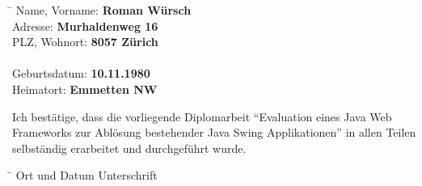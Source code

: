 \begin{tabbing}
  \hspace*{6cm}\= \kill
  Name, Vorname: \> {\bf Roman Würsch} \\
  Adresse: \> {\bf Murhaldenweg 16} \\
  PLZ, Wohnort: \> {\bf 8057 Zürich} \\
  \\
  Geburtsdatum: \> {\bf 10.11.1980} \\
  Heimatort: \> {\bf Emmetten NW} \\
\end{tabbing}

\noindent
Ich bestätige, dass die vorliegende Diplomarbeit ``Evaluation eines Java Web
Frameworks zur Ablösung bestehender Java Swing Applikationen'' in allen Teilen
selbständig erarbeitet und durchgeführt wurde.

\vspace*{3cm}

\begin{tabbing}
  \hspace*{8cm}\= \kill
  Ort und Datum \> {Unterschrift} \\
\end{tabbing}